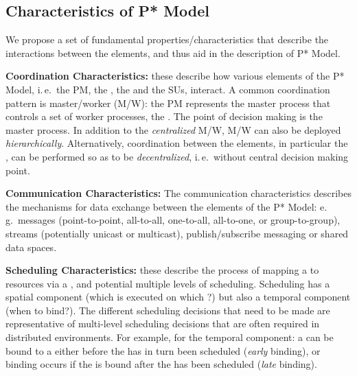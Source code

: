 \documentclass[conference]{IEEEtran}
\begin{document}
\subsection{Characteristics of P* Model}
\label{sec:p_star_elements}


 
We propose a set of fundamental properties/characteristics that
describe the interactions between the elements, and thus aid in the
description of P* Model.


\textbf{Coordination Characteristics:} these describe how
various elements of the P* Model, i.\,e.\ the PM, the \pilot, the \cus
and the SUs, interact. A common coordination pattern is master/worker
(M/W): the PM represents the master process that controls a set of
worker processes, the \pilots. The point of decision making is the
master process. In addition to the \emph{centralized} M/W, M/W can
also be deployed \emph{hierarchically}.  Alternatively, coordination
between the elements, in particular the \pilots, can be performed so as
to be \emph{decentralized}, i.\,e.\ without central decision making
point.

%

\textbf{Communication Characteristics:} The communication characteristics describes the
mechanisms for data exchange between the elements of the P* Model:
e.\,g.\ messages (point-to-point, all-to-all, one-to-all, all-to-one,
or group-to-group), streams (potentially unicast or multicast),
publish/subscribe messaging or shared data spaces.
		
\textbf{Scheduling Characteristics:} these describe the
process of mapping a \su to resources via a \pilot, and potential
multiple levels of scheduling. Scheduling has a spatial component
(which \su is executed on which \pilot?) but also a temporal component
(when to bind?). The different scheduling decisions that need to be
made are representative of multi-level scheduling decisions that are
often required in distributed environments.  For example, for the
temporal component: a \su can be bound to a \pilot either before
the \pilot has in turn been scheduled ({\it early} binding), or 
binding occurs if the \su is bound after the \pilot has been
scheduled ({\it late} binding).  
\end{document}
